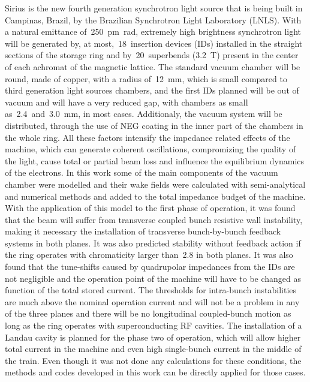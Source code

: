 Sirius is the new fourth generation synchrotron light source that is being built in Campinas, Brazil, by the Brazilian Synchrotron Light Laboratory (LNLS). With a natural emittance of~\SI{250}{\pico\meter\radian}, extremely high brightness synchrotron light will be generated by, at most,~\SI{18}{}~insertion devices (IDs) installed in the straight sections of the storage ring and by~\SI{20}{}~superbends (\SI{3.2}{\tesla}) present in the center of each achromat of the magnetic lattice. The standard vacuum chamber will be round, made of copper, with a radius of~\SI{12}{\milli\meter}, which is small compared to third generation light sources chambers, and the first IDs planned will be out of vacuum and will have a very reduced gap, with chambers as small as~\SI{2.4}{}~and~\SI{3.0}{\milli\meter}, in most cases. Additionaly, the vacuum system will be distributed, through the use of NEG coating in the inner part of the chambers in the whole ring. All these factors intensify the impedance related effects of the machine, which can generate coherent oscillations, compromizing the quality of the light, cause total or partial beam loss and influence the equilibrium dynamics of the electrons. In this work some of the main components of the vacuum chamber were modelled and their wake fields were calculated with semi-analytical and numerical methods and added to the total impedance budget of the machine. With the application of this model to the first phase of operation, it was found that the beam will suffer from transverse coupled bunch resistive wall instability, making it necessary the installation of transverse bunch-by-bunch feedback systems in both planes. It was also predicted stability without feedback action if the ring operates with chromaticity larger than~\SI{2.8}{} in both planes. It was also found that the tune-shifts caused by quadrupolar impedances from the IDs are not negligible and the operation point of the machine will have to be changed as function of the total stored current. The thresholds for intra-bunch instabilities are much above the nominal operation current and will not be a problem in any of the three planes and there will be no longitudinal coupled-bunch motion as long as the ring operates with superconducting RF cavities. The installation of a Landau cavity is planned for the phase two of operation, which will allow higher total current in the machine and even high single-bunch current in the middle of the train. Even though it was not done any calculations for these conditions, the methods and codes developed in this work can be directly applied for those cases.
